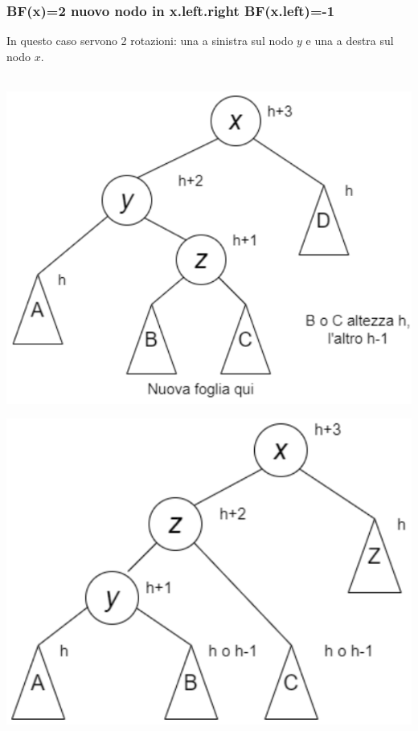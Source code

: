 \documentclass[a4paper,12pt]{article}
\begin{document}
\subsubsection{BF(x)=2 \quad nuovo nodo in x.left.right \quad BF(x.left)=-1}
In questo caso servono 2 rotazioni: una a sinistra sul nodo $y$ e una a destra sul nodo $x$.\\\\
\begin{minipage}{0.31\textwidth}
    \includegraphics[width=\linewidth]{rotazione 2.1.png}
\end{minipage}
\begin{minipage}{0.31\textwidth}
    \includegraphics[width=\linewidth]{rotazione 2.2.png}
\end{minipage}
\end{document}
